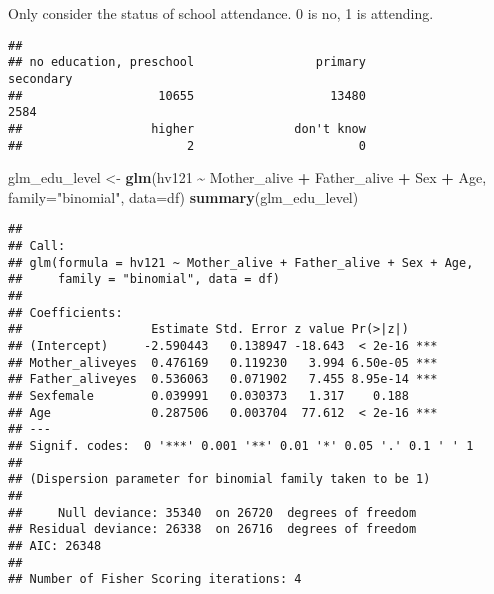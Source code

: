 \documentclass[
]{article}
\newenvironment{Shaded}{\begin{snugshade}}{\end{snugshade}}
\newcommand{\AttributeTok}[1]{\textcolor[rgb]{0.13,0.29,0.53}{#1}}
\newcommand{\FunctionTok}[1]{\textcolor[rgb]{0.13,0.29,0.53}{\textbf{#1}}}
\newcommand{\NormalTok}[1]{#1}
\newcommand{\OtherTok}[1]{\textcolor[rgb]{0.56,0.35,0.01}{#1}}
\newcommand{\SpecialCharTok}[1]{\textcolor[rgb]{0.81,0.36,0.00}{\textbf{#1}}}
\newcommand{\StringTok}[1]{\textcolor[rgb]{0.31,0.60,0.02}{#1}}
\begin{document}
Only consider the status of school attendance. 0 is no, 1 is attending.

\begin{Shaded}
\end{Shaded}

\begin{verbatim}
## 
## no education, preschool                 primary               secondary 
##                   10655                   13480                    2584 
##                  higher              don't know 
##                       2                       0
\end{verbatim}

\begin{Shaded}
\begin{Highlighting}[]
\NormalTok{glm\_edu\_level }\OtherTok{\textless{}{-}} \FunctionTok{glm}\NormalTok{(hv121 }\SpecialCharTok{\textasciitilde{}}\NormalTok{ Mother\_alive }\SpecialCharTok{+}\NormalTok{ Father\_alive }\SpecialCharTok{+}\NormalTok{ Sex }\SpecialCharTok{+}\NormalTok{ Age,}
                      \AttributeTok{family=}\StringTok{"binomial"}\NormalTok{, }\AttributeTok{data=}\NormalTok{df)}
\FunctionTok{summary}\NormalTok{(glm\_edu\_level)}
\end{Highlighting}
\end{Shaded}

\begin{verbatim}
## 
## Call:
## glm(formula = hv121 ~ Mother_alive + Father_alive + Sex + Age, 
##     family = "binomial", data = df)
## 
## Coefficients:
##                  Estimate Std. Error z value Pr(>|z|)    
## (Intercept)     -2.590443   0.138947 -18.643  < 2e-16 ***
## Mother_aliveyes  0.476169   0.119230   3.994 6.50e-05 ***
## Father_aliveyes  0.536063   0.071902   7.455 8.95e-14 ***
## Sexfemale        0.039991   0.030373   1.317    0.188    
## Age              0.287506   0.003704  77.612  < 2e-16 ***
## ---
## Signif. codes:  0 '***' 0.001 '**' 0.01 '*' 0.05 '.' 0.1 ' ' 1
## 
## (Dispersion parameter for binomial family taken to be 1)
## 
##     Null deviance: 35340  on 26720  degrees of freedom
## Residual deviance: 26338  on 26716  degrees of freedom
## AIC: 26348
## 
## Number of Fisher Scoring iterations: 4
\end{verbatim}
\end{document}
